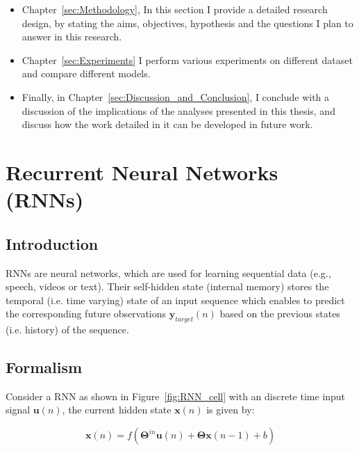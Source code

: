 \documentclass{WitsPhysicsReport}
\begin{document}
\begin{itemize}
    \item Chapter~\ref{sec:Methodology}, In this section I provide a detailed research design, by stating the aims, objectives, hypothesis and the questions I plan to answer in this research.  

    \item Chapter~\ref{sec:Experiments} I perform various experiments on different dataset and compare different models.
    
    \item Finally, in Chapter~\ref{sec:Discussion_and_Conclusion}, I conclude with a discussion of the implications of the analyses presented in this thesis, and discuss how the work detailed in it can be developed in future work.
    \label{item:outline_of_thesis}
\end{itemize}
\newpage

\newpage 
\section{Recurrent Neural Networks (RNNs)}
\label{sec:Recurrent_Neural_Networks}
\subsection{Introduction}
\label{sec:introduction_rnn}
RNNs are neural networks, which are used for learning sequential data (e.g., speech, videos  or text). Their self-hidden state (internal memory) stores the temporal (i.e. time varying) state of an input sequence which enables to predict the corresponding future observations $\mathbf{y}_{target}(n)$ based on the previous states (i.e. history) of the sequence.

\subsection{Formalism}
\label{sec:formalism_rnn}
Consider a RNN as shown in Figure~\ref{fig:RNN_cell} with an discrete time input signal $\mathbf{u}(n)$, the current hidden state $\mathbf{x}(n)$ is given by:

\begin{equation}
\mathbf{x}(n) = f(\mathbf{\Theta}^{in} \mathbf{u}(n) + \mathbf{\Theta}  \mathbf{x}(n-1) + b )
\label{equ:rnn}
\end{equation}

\end{document}

